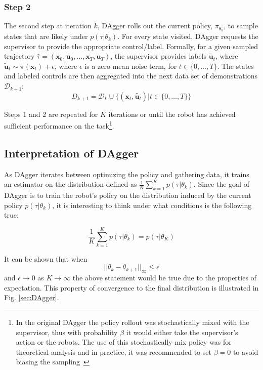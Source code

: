\documentclass[10pt, conference]{ieeeconf}      %
\newcommand{\bu}{\mathbf{u}}
\newcommand{\bx}{\mathbf{x}}
\begin{document}
 \subsubsection{Step 2}
The second step at iteration $k$, DAgger rolls out the current policy, $\pi_{\theta_{k}}$, to sample states that are likely under $p(\tau|\theta_{k})$.  For every state visited, DAgger requests the supervisor to provide the appropriate control/label. Formally, for a given sampled trajectory  $\hat{\tau} = (\bx_0,\bu_0,...,\bx_T,\bu_T )$, the supervisor provides labels $\tilde{\bu}_t$, where $\tilde{\bu}_t \sim \tilde{\pi}(\bx_t) + \epsilon$, where $\epsilon$ is a  zero mean noise term, for $t\in \{0, \ldots, T\}$.
The states and labeled controls are then aggregated into the next data set of demonstrations $\mathcal{D}_{k+1}$:
$$D_{k+1}=\mathcal{D}_k \cup \{(\bx_t,\tilde{\bu_t})|t\in\{0,\ldots,T\}\} $$

Steps 1 and 2 are repeated for $K$ iterations or until the robot has achieved sufficient performance on the
task\footnote{In the original DAgger the policy rollout was stochastically mixed with the supervisor, thus with
    probability $\beta$ it would either take the supervisor's action or the robots. The use of this stochastically mix
    policy was for theoretical analysis and in practice, it was recommended to set $\beta = 0$ to avoid biasing the
sampling~\cite{NIPS2014_5421,ross2010reduction}}.

\subsection{Interpretation of DAgger}
As DAgger iterates between optimizing the policy and gathering data, it trains an estimator on the distribution defined as $\frac{1}{K} \sum^K_{k=1} p(\tau|\theta_k)$. Since the goal of DAgger is to train the robot's policy on the distribution induced by the current policy $p(\tau|\theta_k)$, it is interesting to think under what conditions is the following true: 

$$\frac{1}{K} \sum^K_{k=1} p(\tau|\theta_k) = p(\tau|\theta_K)$$

It can be shown that when $$||\theta_k - \theta_{k+1} ||_{\infty} \leq \epsilon$$ and $\epsilon \rightarrow 0$ as $K \rightarrow \infty$ the above statement would be true due to the properties of expectation. This property of convergence to the final distribution is illustrated in Fig. \ref{sec:DAgger}. 
\end{document}
